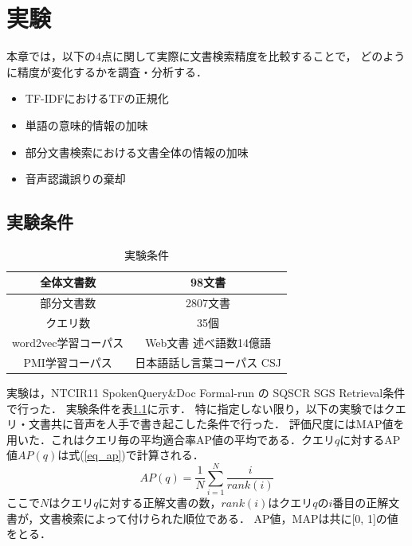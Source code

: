 
\chapter{実験} %
本章では，以下の4点に関して実際に文書検索精度を比較することで，
どのように精度が変化するかを調査・分析する．
\begin{itemize}
    \item TF-IDFにおけるTFの正規化                
    \item 単語の意味的情報の加味                  
    \item 部分文書検索における文書全体の情報の加味
    \item 音声認識誤りの棄却                      
\end{itemize}

\section{実験条件}
\begin{table}[htbp]
    \begin{center}
        \caption{実験条件}
        \begin{tabular}{|c|c|}
            \hline
            全体文書数 & 98文書 \\ \hline
            部分文書数 & 2807文書 \\ \hline
            クエリ数 & 35個 \\ \hline
            word2vec学習コーパス & Web文書 述べ語数14億語 \\ \hline
            PMI学習コーパス & 日本語話し言葉コーパス CSJ \\ \hline
        \end{tabular}
        \label{t_condition}
    \end{center}
\end{table}
実験は，NTCIR11 SpokenQuery\&Doc Formal-run の SQSCR SGS Retrieval条件で行った．
実験条件を表\ref{t_condition}に示す．
特に指定しない限り，以下の実験ではクエリ・文書共に音声を人手で書き起こした条件で行った．
評価尺度にはMAP値を用いた．これはクエリ毎の平均適合率AP値の平均である．クエリ$q$に対するAP値$AP(q)$は式(\ref{eq_ap})で計算される．
\begin{equation}
    AP(q) = \frac{1}{N} \sum^N_{i=1} \frac{i}{rank(i)}    \label{eq_ap}
\end{equation}
ここで$N$はクエリ$q$に対する正解文書の数，$rank(i)$はクエリ$q$の$i$番目の正解文書が，文書検索によって付けられた順位である．
AP値，MAPは共に[0, 1]の値をとる．

